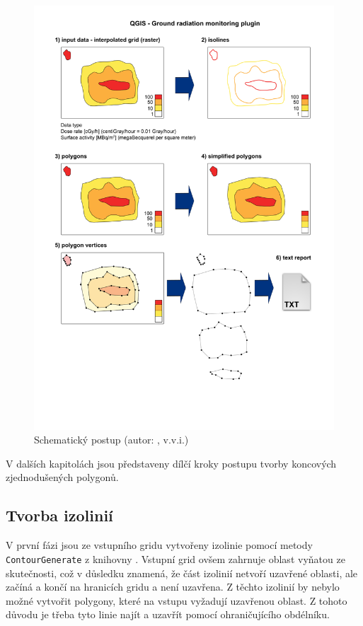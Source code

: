 \begin{figure}[H]
    \centering
      \includegraphics[width=350pt]{./pictures/ACR_radiacni_pruzkum_polygony_v3.png}
      \caption[Schematický postup]{Schematický postup (autor: , v.v.i.)}
      \label{fig:schema}
\end{figure}

V dalších kapitolách jsou představeny dílčí kroky postupu tvorby koncových zjednodušených polygonů.

\subsection{Tvorba izolinií}

V první fázi jsou ze vstupního gridu vytvořeny izolinie pomocí metody \texttt{ContourGenerate} z knihovny . Vstupní grid ovšem zahrnuje oblast vyňatou ze skutečnosti, což v důsledku znamená, že část izolinií netvoří uzavřené oblasti, ale začíná a končí na hranicích gridu a není uzavřena. Z těchto izolinií by nebylo možné vytvořit polygony, které na vstupu vyžadují uzavřenou oblast. Z tohoto důvodu je třeba tyto linie najít a uzavřít pomocí ohraničujícího obdélníku. 

